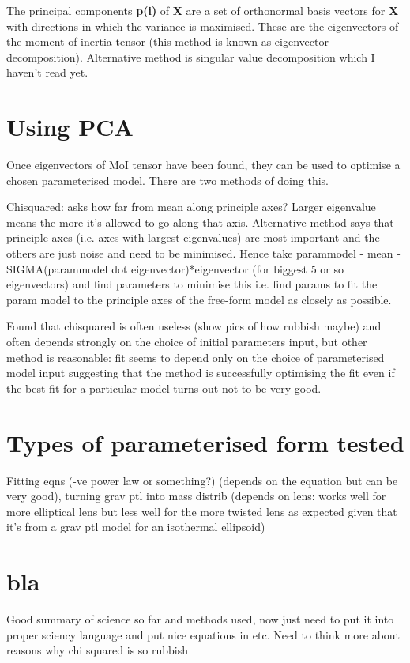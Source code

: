 \documentclass{article}
\begin{document}
The principal components \textbf{p(i)} of \textbf{X} are a set of orthonormal basis vectors for \textbf{X} with directions in which the variance is maximised. These are the eigenvectors of the moment of inertia tensor (this method is known as eigenvector decomposition). Alternative method is singular value decomposition which I haven't read yet.

\section{Using PCA}
Once eigenvectors of MoI tensor have been found, they can be used to optimise a chosen parameterised model. There are two methods of doing this.

Chisquared: asks how far from mean along principle axes? Larger eigenvalue means the more it's allowed to go along that axis. 
Alternative method says that principle axes (i.e. axes with largest eigenvalues) are most important and the others are just noise and need to be minimised. Hence take parammodel - mean - SIGMA(parammodel dot eigenvector)*eigenvector (for biggest 5 or so eigenvectors) and find parameters to minimise this i.e. find params to fit the param model to the principle axes of the free-form model as closely as possible.

Found that chisquared is often useless (show pics of how rubbish maybe) and often depends strongly on the choice of initial parameters input, but other method is reasonable: fit seems to depend only on the choice of parameterised model input suggesting that the method is successfully optimising the fit even if the best fit for a particular model turns out not to be very good.

\section{Types of parameterised form tested}
Fitting eqns (-ve power law or something?) (depends on the equation but can be very good), 
turning grav ptl into mass distrib (depends on lens: works well for more elliptical lens but less well for the more twisted lens as expected given that it's from a grav ptl model for an isothermal ellipsoid)


\section{bla}
Good summary of science so far and methods used, now just need to put it into proper sciency language and put nice equations in etc. Need to think more about reasons why chi squared is so rubbish
\end{document}
